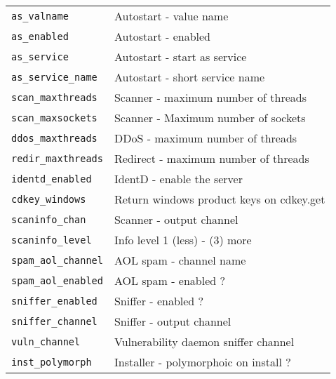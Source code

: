 \begin{table}[ht!]
\begin{tabular}{l l}
		\texttt{as\_valname} & Autostart - value name\\
		\texttt{as\_enabled} & Autostart - enabled\\
		\texttt{as\_service} & Autostart - start as service\\
		\texttt{as\_service\_name} & Autostart - short service name\\
		\texttt{scan\_maxthreads} & Scanner - maximum number of threads\\
		\texttt{scan\_maxsockets} & Scanner - Maximum number of sockets\\
		\texttt{ddos\_maxthreads} & DDoS - maximum number of threads\\
		\texttt{redir\_maxthreads} & Redirect - maximum number of threads\\
		\texttt{identd\_enabled} & IdentD - enable the server\\
		\texttt{cdkey\_windows} & Return windows product keys on cdkey.get\\
		\texttt{scaninfo\_chan} & Scanner - output channel\\
		\texttt{scaninfo\_level} & Info level 1 (less) - (3) more\\
		\texttt{spam\_aol\_channel} & AOL spam - channel name\\
		\texttt{spam\_aol\_enabled} & AOL spam - enabled ?\\
		\texttt{sniffer\_enabled} & Sniffer - enabled ?\\
		\texttt{sniffer\_channel} & Sniffer - output channel\\
		\texttt{vuln\_channel} & Vulnerability daemon sniffer channel\\
		\texttt{inst\_polymorph} & Installer - polymorphoic on install ?\\
		\bottomrule
	\end{tabular}
\end{table}

